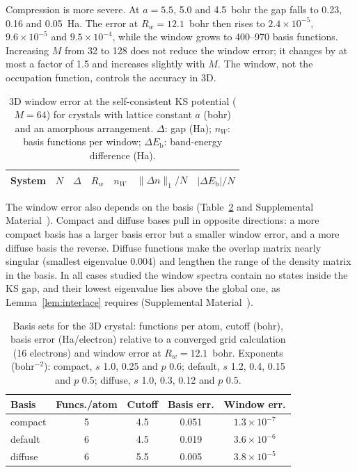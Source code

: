 \documentclass[aps,prb,twocolumn,superscriptaddress,floatfix,longbibliography]{revtex4-2}
\theoremstyle{remark}
\newcommand{\SM}{Supplemental Material~\cite{SM}}
\begin{document}
Compression is more severe. At $a=5.5$, 5.0 and 4.5~bohr the gap falls to 0.23, 0.16 and 0.05~Ha. The error at
$R_w=12.1$~bohr then rises to $2.4\times10^{-5}$, $9.6\times10^{-5}$ and $9.5\times10^{-4}$, while the window grows to
400--970 basis functions. Increasing $M$ from 32 to 128 does not reduce the window error; it changes by at most a factor
of 1.5 and increases slightly with $M$. The window, not the occupation function, controls the accuracy in 3D.

\begin{table}[t]
\caption{\label{tab:compress}3D window error at the self-consistent KS potential ($M=64$) for crystals with lattice constant
$a$ (bohr) and an amorphous arrangement. $\Delta$: gap (Ha); $n_W$: basis functions per window; $\Delta E_\mathrm{b}$:
band-energy difference (Ha).}
\begin{ruledtabular}
\footnotesize\setlength{\tabcolsep}{2pt}
\begin{tabular}{lcccccc}
System & $N$ & $\Delta$ & $R_w$ & $n_W$ & $\|\Delta n\|_1/N$ & $|\Delta E_\mathrm{b}|/N$ \\
\hline

\end{tabular}
\end{ruledtabular}
\end{table}

The window error also depends on the basis (Table~\ref{tab:bases} and \SM). Compact and diffuse bases pull in opposite
directions: a more compact basis has a larger basis error but a smaller window error, and a more diffuse basis the reverse.
Diffuse functions make the overlap matrix nearly singular (smallest eigenvalue 0.004) and lengthen the range of the density
matrix in the basis. In all cases studied the window spectra contain no states inside the KS gap, and their lowest
eigenvalue lies above the global one, as Lemma~\ref{lem:interlace} requires (\SM).

\begin{table}[t]
\caption{\label{tab:bases}Basis sets for the 3D crystal: functions per atom, cutoff (bohr), basis error (Ha/electron)
relative to a converged grid calculation (16 electrons) and window error at $R_w=12.1$~bohr. Exponents (bohr$^{-2}$): compact, $s$ 1.0, 0.25 and $p$ 0.6; default, $s$ 1.2, 0.4, 0.15 and $p$ 0.5; diffuse, $s$ 1.0, 0.3, 0.12 and $p$ 0.5.}
\begin{ruledtabular}
\footnotesize\setlength{\tabcolsep}{3pt}
\begin{tabular}{lcccc}
Basis & Funcs./atom & Cutoff & Basis err. & Window err. \\
\hline
compact & 5 & 4.5 & 0.051 & $1.3\times10^{-7}$ \\
default & 6 & 4.5 & 0.019 & $3.6\times10^{-6}$ \\
diffuse & 6 & 5.5 & 0.005 & $3.8\times10^{-5}$ \\
\end{tabular}
\end{ruledtabular}
\end{table}
\end{document}
